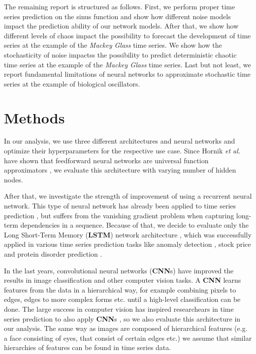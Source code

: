 \documentclass{article}
\begin{document}
The remaining report is structured as follows. First, we perform proper time
series prediction on the sinus function and show how different noise models
impact the prediction ability of our network models. After that, we show how 
different levels of chaos impact the possibility to forecast the development 
of time series at the example of the \emph{Mackey Glass} time series. We show
how the stochasticity of noise impactss the possibility to predict deterministic
chaotic time series at the example of the \emph{Mackey Glass} time series. Last
but not least, we report fundamental limitations of neural networks to
approximate stochastic time series at the example of biological oscillators.

\section{Methods}

In our analysis, we use three different architectures and neural networks and
optimize their hyperparameters for the respective use case. Since Hornik
\textit{et al.} have shown that feedforward neural networks are universal
function approximators \cite{hornik1989}, we evaluate this architecture with
varying number of hidden nodes.

After that, we investigate the strength of
improvement of using a recurrent neural network. This type of neural network has
already been applied to time series prediction \cite{connor1994}, but suffers
from the vanishing gradient problem when capturing long-term dependencies in a
sequence. Because of that, we decide to evaluate only the Long Short-Term Memory
(\textbf{LSTM})
network architecture \cite{hochreiter1997}, which was successfully applied in
various time series prediction tasks like anomaly detection \cite{malhotra2015},
stock price \cite{fischer2018} and protein disorder prediction
\cite{hanson2016}.

In the last years, convolutional neural networks (\textbf{CNN}s) have improved
the results in image classification \cite{krizhevsky2012} and other computer
vision tasks. A \textbf{CNN} learns features from the data in a hierarchical
way, for example combining pixels to edges, edges to more complex forms etc.
until a high-level classification can be done. The large success in computer
vision has inspired researchears in time series prediction to also apply
\textbf{CNN}s \cite{cui2016, borovykh2017}, so we also evaluate this
architecture in our analysis. The same way as images are composed of 
hierarchical features (e.g. a face consisting of eyes, that consist of 
certain edges etc.) we assume that similar hierarchies of features can be found
in time series data.
\end{document}
